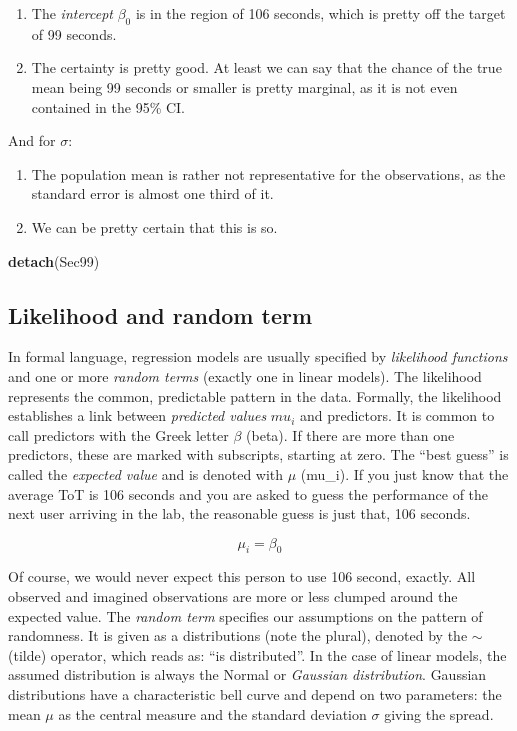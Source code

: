 \documentclass[]{svmono}
\newenvironment{Shaded}{\begin{snugshade}}{\end{snugshade}}
\newcommand{\KeywordTok}[1]{\textcolor[rgb]{0.13,0.29,0.53}{\textbf{#1}}}
\newcommand{\NormalTok}[1]{#1}
\providecommand{\tightlist}{%
  \setlength{\itemsep}{0pt}\setlength{\parskip}{0pt}}
\theoremstyle{definition}
\theoremstyle{definition}
\theoremstyle{definition}
\theoremstyle{remark}
\begin{document}
\begin{enumerate}
\def\labelenumi{\arabic{enumi}.}
\tightlist
\item
  The \emph{intercept} \(\beta_0\) is in the region of 106 seconds,
  which is pretty off the target of 99 seconds.
\item
  The certainty is pretty good. At least we can say that the chance of
  the true mean being 99 seconds or smaller is pretty marginal, as it is
  not even contained in the 95\% CI.
\end{enumerate}

And for \(\sigma\):

\begin{enumerate}
\def\labelenumi{\arabic{enumi}.}
\tightlist
\item
  The population mean is rather not representative for the observations,
  as the standard error is almost one third of it.
\item
  We can be pretty certain that this is so.
\end{enumerate}

\begin{Shaded}
\begin{Highlighting}[]
\KeywordTok{detach}\NormalTok{(Sec99)}
\end{Highlighting}
\end{Shaded}

\subsection{Likelihood and random
term}\label{likelihood-and-random-term}

In formal language, regression models are usually specified by
\emph{likelihood functions} and one or more \emph{random terms} (exactly
one in linear models). The likelihood represents the common, predictable
pattern in the data. Formally, the likelihood establishes a link between
\emph{predicted values} \(mu_i\) and predictors. It is common to call
predictors with the Greek letter \(\beta\) (beta). If there are more
than one predictors, these are marked with subscripts, starting at zero.
The ``best guess'' is called the \emph{expected value} and is denoted
with \(\mu\) (mu\_i). If you just know that the average ToT is 106
seconds and you are asked to guess the performance of the next user
arriving in the lab, the reasonable guess is just that, 106 seconds.

\[\mu_i = \beta_0\]

Of course, we would never expect this person to use 106 second, exactly.
All observed and imagined observations are more or less clumped around
the expected value. The \emph{random term} specifies our assumptions on
the pattern of randomness. It is given as a distributions (note the
plural), denoted by the \(\sim\) (tilde) operator, which reads as: ``is
distributed''. In the case of linear models, the assumed distribution is
always the Normal or \emph{Gaussian distribution}. Gaussian
distributions have a characteristic bell curve and depend on two
parameters: the mean \(\mu\) as the central measure and the standard
deviation \(\sigma\) giving the spread.
\end{document}
